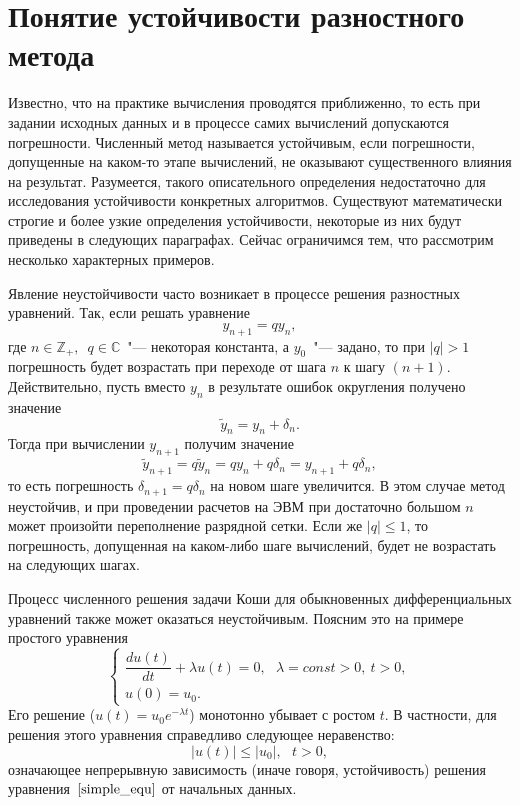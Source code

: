 \documentclass[11pt,a4paper,twoside,listtotoc,bibtotoc]{report}
\numberwithin{equation}{section}
\theoremstyle{definition}
\theoremstyle{plain}
\begin{document}
\section{Понятие устойчивости разностного метода}
%
Известно, что на практике вычисления проводятся приближенно, то есть при
задании исходных данных и в процессе самих вычислений допускаются погрешности.
Численный метод называется устойчивым, если погрешности, допущенные на каком-то
 этапе вычислений, не оказывают существенного влияния на результат. Разумеется,
 такого описательного определения недостаточно для исследования устойчивости
 конкретных алгоритмов. Существуют математически строгие и более узкие
 определения устойчивости, некоторые из них будут приведены в следующих
 параграфах. Сейчас ограничимся тем, что рассмотрим несколько характерных
 примеров.

 Явление неустойчивости часто возникает в процессе решения разностных уравнений.
 Так, если решать уравнение
%
$$
    y_{n+1}=qy_n,
$$
%
где $n \in \mathbb{Z}_+,$~$q \in \mathbb{C}$~"--- некоторая константа, а $y_0$~"---
задано, то при
$|q| > 1$ погрешность будет возрастать при переходе от шага $n$ к шагу $(n+1)$.
Действительно, пусть вместо $y_n$ в результате ошибок округления получено
значение
%
$$
    \widetilde{y}_n = y_n+\delta_n.
$$
%
Тогда при вычислении $y_{n+1}$ получим значение
%
$$
    \widetilde{y}_{n+1} = q\widetilde{y}_n = qy_n+q\delta_n =
    y_{n+1} + q\delta_n,
$$
%
то есть погрешность $\delta_{n+1}=q\delta_n$ на новом шаге увеличится.
В этом случае метод неустойчив, и при проведении расчетов на ЭВМ при
достаточно большом $n$ может произойти переполнение разрядной сетки.
Если же $|q| \leqslant 1$, то погрешность, допущенная на каком-либо шаге
вычислений, будет не возрастать на следующих шагах.

Процесс численного решения задачи Коши для обыкновенных дифференциальных
уравнений также может оказаться неустойчивым.
Поясним это на примере простого уравнения
%
\begin{equation}
%
    \label{simple_equ}
    \begin{cases}
        \dfrac{du(t)}{dt}+\lambda u(t) = 0,~~~\lambda=const>0,~t>0,\\
        u(0)=u_0.
    \end{cases}
%
\end{equation}
%
Его решение ($u(t) = u_0e^{-\lambda t}$) монотонно убывает с ростом $t$. В частности,
для решения этого уравнения справедливо следующее неравенство:
%
\begin{equation}
%
    \label{simple1}
    |u(t)| \leqslant |u_0|,~~~t>0,
%
\end{equation}
%
означающее непрерывную зависимость (иначе говоря, устойчивость) решения
уравнения~$\eqref{simple_equ}$ от начальных данных.
\end{document}
